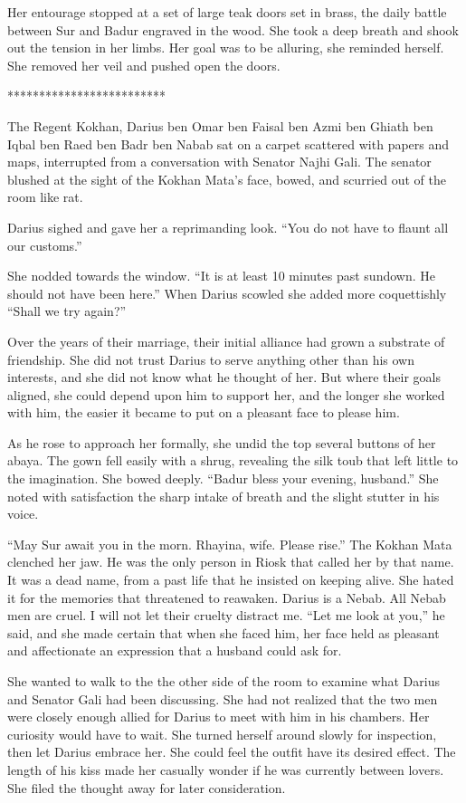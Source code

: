\documentclass{article}
\begin{document}
	Her entourage stopped at a set of large teak doors set in brass, the daily battle between Sur and Badur engraved in the wood. She took a deep breath and shook out the tension in her limbs. Her goal was to be alluring, she reminded herself. She removed her veil and pushed open the doors.
	
	*************************
	
	The Regent Kokhan, Darius ben Omar ben Faisal ben Azmi ben Ghiath ben Iqbal ben Raed ben Badr ben Nabab sat on a carpet scattered with papers and maps, interrupted from a conversation with Senator Najhi Gali. The senator blushed at the sight of the Kokhan Mata’s face, bowed, and scurried out of the room like rat.
	
	Darius sighed and gave her a reprimanding look. “You do not have to flaunt all our customs.”
	
	She nodded towards the window. “It is at least 10 minutes past sundown. He should not have been here.” When Darius scowled she added more coquettishly “Shall we try again?”
	
	Over the years of their marriage, their initial alliance had grown a substrate of friendship. She did not trust Darius to serve anything other than his own interests, and she did not know what he thought of her. But where their goals aligned, she could depend upon him to support her, and the longer she worked with him, the easier it became to put on a pleasant face to please him.
	
	As he rose to approach her formally, she undid the top several buttons of her abaya. The gown fell easily with a shrug, revealing the silk toub that left little to the imagination.  She bowed deeply. “Badur bless your evening, husband.” She noted with satisfaction the sharp intake of breath and the slight stutter in his voice. 
	
	“May Sur await you in the morn. Rhayina, wife. Please rise.” The Kokhan Mata clenched her jaw. He was the only person in Riosk that called her by that name. It was a dead name, from a past life that he insisted on keeping alive. She hated it for the memories that threatened to reawaken. Darius is a Nebab. All Nebab men are cruel. I will not let their cruelty distract me. “Let me look at you,” he said, and she made certain that when she faced him, her face held as pleasant and affectionate an expression that a husband could ask for.
	
	She wanted to walk to the the other side of the room  to examine what Darius and Senator Gali had been discussing. She had not realized that the two men were closely enough allied for Darius to meet with him in his chambers. Her curiosity would have to wait. She turned herself around slowly for inspection, then let Darius embrace her. She could feel the outfit have its desired effect. The length of his kiss made her casually wonder if he was currently between lovers. She filed the thought away for later consideration. 
	
\end{document}
